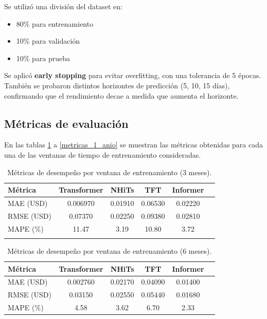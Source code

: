 \documentclass[12pt]{article}
\begin{document}
Se utilizó una división del dataset en:
\begin{itemize}
\item 80\% para entrenamiento
\item 10\% para validación
\item 10\% para prueba
\end{itemize}

Se aplicó \textbf{early stopping} para evitar overfitting, con una tolerancia de 5 épocas. También se probaron distintos horizontes de predicción (5, 10, 15 días), confirmando que el rendimiento decae a medida que aumenta el horizonte.

\bigskip
\subsection{Métricas de evaluación}

En las tablas \ref{metricas_3_meses} a  \ref{metricas_1_anio} se muestran las métricas obtenidas para cada una de las ventanas de tiempo de entrenamiento consideradas.

\begin{table}[H]
\centering
\caption{Métricas de desempeño por ventana de entrenamiento (3 meses).}
\begin{tabular}{lccccc}
\toprule
\textbf{Métrica} & \textbf{Transformer} & \textbf{NHiTs} & \textbf{TFT} & \textbf{Informer} \\ 
\midrule
MAE (USD)  & 0.006970 & 0.01910 & 0.06530 & 0.02220 \\
RMSE (USD) & 0.07370 & 0.02250 & 0.09380 & 0.02810 \\
MAPE (\%)  & 11.47 & 3.19 & 10.80 & 3.72 \\
\bottomrule
\label{metricas_3_meses}
\end{tabular}
\end{table}

\begin{table}[H]
\centering
\caption{Métricas de desempeño por ventana de entrenamiento (6 meses).}
\begin{tabular}{lccccc}
\toprule
\textbf{Métrica} & \textbf{Transformer} & \textbf{NHiTs} & \textbf{TFT} & \textbf{Informer} \\ 
\midrule
MAE (USD)  & 0.002760 & 0.02170 & 0.04090 & 0.01400 \\
RMSE (USD) & 0.03150 & 0.02550 & 0.05440 & 0.01680 \\
MAPE (\%)  & 4.58 & 3.62 & 6.70 & 2.33 \\
\bottomrule
\end{tabular}
\label{metricas_6_meses}
\end{table}
\end{document}
